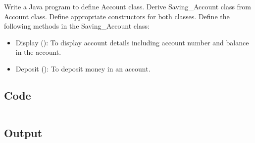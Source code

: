 \documentclass[../main.tex]{subfiles}
\begin{document}
Write a Java program to define Account class. Derive Saving\_Account class from
Account class. Define appropriate constructors for both classes. Define the
following methods in the Saving\_Account class:
\begin{itemize}
	\item Display (): To display account details including account number and
	      balance in the account.
	\item Deposit (): To deposit money in an account.
\end{itemize}

\subsection{Code}
\inputminted[frame=lines, breaklines, breakanywhere, numberblanklines=false]{java}{./programs/prog15/SavingsAccount.java}

\subsection{Output}
\end{document}
